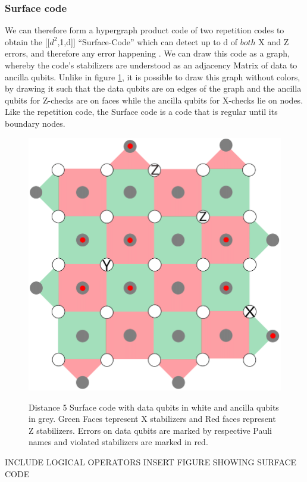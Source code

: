 \subsubsection{Surface code}
We can therefore form a hypergraph product code of two repetition
codes to
obtain the [[$d^2$,1,d]] ``Surface-Code'' which can detect up
to d of $both$ X and Z errors, and 
therefore any error happening \cite{joschka}.
We can draw this code as a graph, whereby the code's stabilizers
are understood as an adjacency Matrix of data to ancilla qubits.
Unlike in figure \ref{fig: surface_code}, it is possible to draw this 
graph without colors, by drawing it such that the data qubits are on 
edges of the graph and the ancilla qubits for Z-checks are on faces
while the ancilla qubits for X-checks lie on nodes.\\
Like the repetition code, the Surface code is a code that is regular until
its boundary nodes. 

\begin{figure}[h!]
	\begin{center}
	\captionsetup{justification=centering,margin=2cm}
	\includegraphics[scale=0.35]{./img/figures/d5surfaceCode.png}\\
	\caption{Distance 5 Surface code with data qubits in white and 
    ancilla qubits in grey. Green Faces tepresent X stabilizers
    and Red faces represent Z stabilizers.
    Errors on data qubits are marked
    by respective Pauli names and violated stabilizers are marked in red.}
	\label{fig: surface_code}
	\end{center}
\end{figure}


INCLUDE LOGICAL OPERATORS
INSERT FIGURE SHOWING SURFACE CODE
\newpage